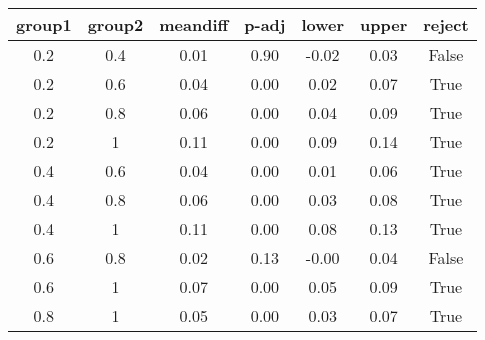 \begin{tabular}{|c|c|c|c|c|c|c|}
\toprule
group1 & group2 &  meandiff &  p-adj &  lower &  upper &  reject \\
\midrule
   0.2 &    0.4 &      0.01 &   0.90 &  -0.02 &   0.03 &   False \\
   0.2 &    0.6 &      0.04 &   0.00 &   0.02 &   0.07 &    True \\
   0.2 &    0.8 &      0.06 &   0.00 &   0.04 &   0.09 &    True \\
   0.2 &      1 &      0.11 &   0.00 &   0.09 &   0.14 &    True \\
   0.4 &    0.6 &      0.04 &   0.00 &   0.01 &   0.06 &    True \\
   0.4 &    0.8 &      0.06 &   0.00 &   0.03 &   0.08 &    True \\
   0.4 &      1 &      0.11 &   0.00 &   0.08 &   0.13 &    True \\
   0.6 &    0.8 &      0.02 &   0.13 &  -0.00 &   0.04 &   False \\
   0.6 &      1 &      0.07 &   0.00 &   0.05 &   0.09 &    True \\
   0.8 &      1 &      0.05 &   0.00 &   0.03 &   0.07 &    True \\
\bottomrule
\end{tabular}
